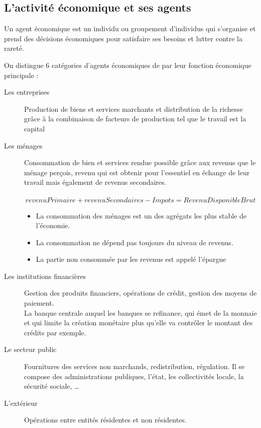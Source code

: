 	\subsection{L'activité économique et ses agents}
	\begin{definition}
		Un agent économique est un individu ou groupement d'individus qui s'organise et prend des décisions économiques pour satisfaire ses besoins et
		lutter contre la rareté.
	\end{definition}

	On distingue 6 catégories d'agents économiques de par leur fonction économique principale : 
	\begin{description}
		\item[Les entreprises]Production de biens et services marchants et distribution de la richesse grâce à la combinaison de facteurs de
			production tel que le travail est la capital
		\item[Les ménages] Consommation de bien et services rendue possible grâce aux revenus que le ménage perçois, revenu qui est obtenir pour
			l'essentiel en échange de leur travail mais également de revenus secondaires.\\~
			$$revenuPrimaire + revenuSecondaires - Impots = RevenuDisponibleBrut$$

			\begin{remarque}
				\begin{itemize}
					\item La consommation des ménages est un des agrégats les plus stable de l'économie.
					\item La consommation ne dépend pas toujours du niveau de revenus.
					\item La partie non consommée par les revenus est appelé l'épargne
				\end{itemize}
			\end{remarque}
		\item[Les institutions financières] Gestion des produits financiers, opérations de crédit, gestion des moyens de paiement.\\
			La banque centrale auquel les banques se refinance, qui émet de la monnaie et qui limite la création monétaire plus qu'elle va contrôler le
			montant des crédits par exemple.
		\item[Le secteur public] Fournitures des services non marchands, redistribution, régulation. Il se compose des administrations publiques,
			l'état, les collectivités locale, la sécurité sociale, \ldots 
		\item[L'extérieur] Opérations entre entités résidentes et non résidentes.
	\end{description}
